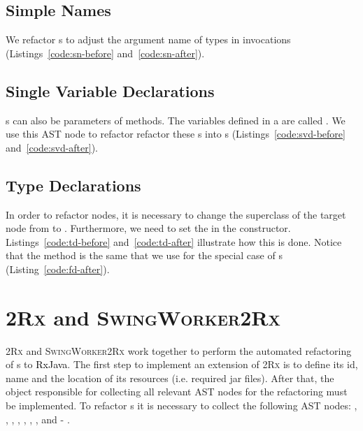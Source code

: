 \documentclass[type=bsc,accentcolor=tud9c]{tudthesis}
\newcommand{\framework}[1]{\textcolor{black}{#1}}
\newcommand{\toolcore}{\textsc{2Rx}}
\newcommand{\toolextension}{\textsc{SwingWorker2Rx}}
\begin{document}


\subsection{Simple Names}
\label{sec:imp-simpleName}
We refactor s to adjust the argument name of  types in invocations (Listings~\ref{code:sn-before} and~\ref{code:sn-after}).



\subsection{Single Variable Declarations}
\label{sec:imp-singleVarDeclaration}
s can also be parameters of methods. The variables defined in a  are called . We use this AST node to refactor refactor these s into s (Listings~\ref{code:svd-before} and~\ref{code:svd-after}).



\subsection{Type Declarations}
\label{sec:imp-typeDecl}
In order to refactor  nodes, it is necessary to change the superclass of the target node from  to . Furthermore, we need to set the  in the constructor. Listings~\ref{code:td-before} and~\ref{code:td-after} illustrate how this is done. Notice that the method  is the same that we use for the special case of s (Listing~\ref{code:fd-after}).



\section{\toolcore{} and \toolextension{}}
\toolcore{} and \toolextension{} work together to perform the automated refactoring of s to \framework{RxJava}. The first step to implement an extension of \toolcore{} is to define its id, name and the location of its resources (i.e. required jar files). After that, the object responsible for collecting all relevant AST nodes for the refactoring must be implemented. To refactor s it is necessary to collect the following AST nodes: , , , , , , ,  and - .
\end{document}
